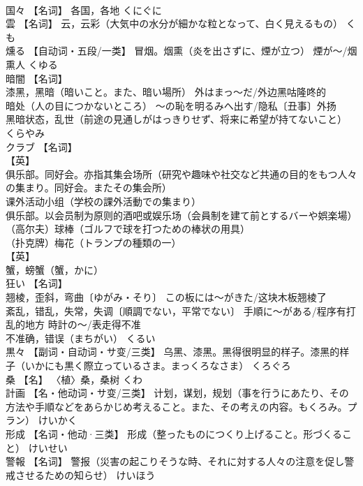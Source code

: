 \documentclass[8pt]{extreport}
\begin{document}
\begin{CJK}{UTF8}{min}
\\	国々	【名词】 各国，各地	くにぐに	
\\	雲	【名词】 云，云彩（大気中の水分が細かな粒となって、白く見えるもの）	くも	
\\	燻る	【自动词・五段/一类】 冒烟。烟熏（炎を出さずに、煙が立つ） 煙が～/烟熏人	くゆる	
\\	暗闇	【名词】 
\\	漆黑，黑暗（暗いこと。また、暗い場所） 外はまっ～だ/外边黑咕隆咚的 
\\	暗处（人の目につかないところ） ～の恥を明るみへ出す/隐私〔丑事〕外扬 
\\	黑暗状态，乱世（前途の見通しがはっきりせず、将来に希望が持てないこと）	くらやみ	
\\	クラブ	【名词】 
\\	【英】
\\	俱乐部。同好会。亦指其集会场所（研究や趣味や社交など共通の目的をもつ人々の集まり。同好会。またその集会所） 
\\	课外活动小组（学校の課外活動での集まり） 
\\	俱乐部。以会员制为原则的酒吧或娱乐场（会員制を建て前とするバーや娯楽場） 
\\	（高尔夫）球棒（ゴルフで球を打つための棒状の用具） 
\\	（扑克牌）梅花（トランプの種類の一） 
\\	【英】
\\	蟹，螃蟹（蟹，かに）		
\\	狂い	【名词】 
\\	翘棱，歪斜，弯曲〔ゆがみ・そり〕 この板には～がきた/这块木板翘棱了 
\\	紊乱，错乱，失常，失调〔順調でない，平常でない〕 手順に～がある/程序有打乱的地方 時計の～/表走得不准 
\\	不准确，错误（まちがい）	くるい	
\\	黒々	【副词・自动词・サ变/三类】 乌黑、漆黑。黑得很明显的样子。漆黑的样子（いかにも黒く際立っているさま。まっくろなさま）	くろぐろ	
\\	桑	【名】 〈植〉桑，桑树	くわ	
\\	計画	【名・他动词・サ变/三类】 计划，谋划，规划（事を行うにあたり、その方法や手順などをあらかじめ考えること。また、その考えの内容。もくろみ。プラン）	けいかく	
\\	形成	【名词・他动·三类】 形成（整ったものにつくり上げること。形づくること）	けいせい	
\\	警報	【名词】 警报（災害の起こりそうな時、それに対する人々の注意を促し警戒させるための知らせ）	けいほう	

\end{CJK}
\end{document}
